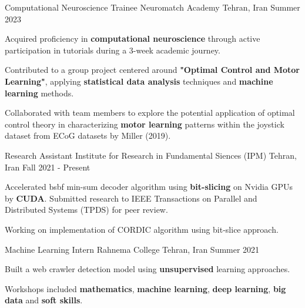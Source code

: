 

\begin{cventries}

  \cventry
    {Computational Neuroscience Trainee} %
    {Neuromatch Academy} %
    {Tehran, Iran} %
    {Summer 2023} %
    {
      \begin{cvitems} %
	\item {Acquired proficiency in {\textbf{computational neuroscience}} through active participation in tutorials during a 3-week academic journey.}
        \item {Contributed to a group project centered around {\textbf{"Optimal Control and Motor Learning"}}, applying {\textbf{statistical data analysis}} techniques and {\textbf{machine learning}} methods.}
        \item {Collaborated with team members to explore the potential application of optimal control theory in characterizing {\textbf{motor learning}} patterns within the joystick dataset from ECoG datasets by Miller (2019).}
      \end{cvitems}
    }

  \cventry
    {Research Assistant} %
    {Institute for Research in Fundamental Siences (IPM)} %
    {Tehran, Iran} %
    {Fall 2021 - Present} %
    {
      \begin{cvitems} %
	\item {Accelerated bsbf min-sum decoder algorithm using {\textbf{bit-slicing}} on Nvidia GPUs by {\textbf{CUDA}}. Submitted research to IEEE Transactions on Parallel and Distributed Systems (TPDS) for peer review.}
        \item {Working on implementation of CORDIC algorithm using bit-slice approach.}
      \end{cvitems}
    }

  \cventry
    {Machine Learning Intern} %
    {Rahnema College} %
    {Tehran, Iran} %
    {Summer 2021} %
    {
      \begin{cvitems} %
        \item {Built a web crawler detection model using {\textbf{unsupervised}} learning approaches.}
	\item{Workshops included {\textbf{mathematics}}, {\textbf{machine learning}}, {\textbf{deep learning}}, {\textbf{big data}} and {\textbf{soft skills}}.}
      \end{cvitems}
    }


\end{cventries}
